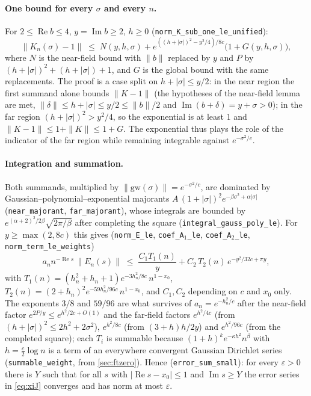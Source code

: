 \documentclass[11pt]{article}
\theoremstyle{definition}
\newcommand{\lean}[1]{\texttt{#1}}
\newcommand{\re}{\operatorname{Re}}
\newcommand{\im}{\operatorname{Im}}
\begin{document}
\paragraph{One bound for every $\sigma$ and every $n$.} For $2 \le \re b \le 4$, $y = \im b \ge 2$, $h \ge 0$ (\lean{norm\_K\_sub\_one\_le\_unified}):
\[
\|K_n(\sigma) - 1\| \;\le\; N(y,h,\sigma) + e^{((h+|\sigma|)^2 - y^2/4)/8c}\bigl(1 + G(y,h,\sigma)\bigr),
\]
where $N$ is the near-field bound with $\|b\|$ replaced by $y$ and $P$ by $(h+|\sigma|)^2 + (h+|\sigma|) + 1$, and $G$ is the global bound with the same replacements. The proof is a case split on $h + |\sigma| \le y/2$: in the near region the first summand alone bounds $\|K-1\|$ (the hypotheses of the near-field lemma are met, $\|\delta\| \le h + |\sigma| \le y/2 \le \|b\|/2$ and $\im(b+\delta) = y + \sigma > 0$); in the far region $(h+|\sigma|)^2 > y^2/4$, so the exponential is at least $1$ and $\|K - 1\| \le 1 + \|K\| \le 1 + G$. The exponential thus plays the role of the indicator of the far region while remaining integrable against $e^{-\sigma^2/c}$.

\paragraph{Integration and summation.} Both summands, multiplied by $\|\mathrm{gw}(\sigma)\| = e^{-\sigma^2/c}$, are dominated by Gaussian--polynomial--exponential majorants $A\,(1+|\sigma|)^2 e^{-\beta\sigma^2 + \alpha|\sigma|}$ (\lean{near\_majorant}, \lean{far\_majorant}), whose integrals are bounded by $e^{(\alpha+2)^2/2\beta}\sqrt{2\pi/\beta}$ after completing the square (\lean{integral\_gauss\_poly\_le}). For $y \ge \max(2, 8c)$ this gives (\lean{norm\_E\_le}, \lean{coef\_A$_1$\_le}, \lean{coef\_A$_2$\_le}, \lean{norm\_term\_le\_weights})
\[
a_n n^{-\re s}\,\|E_n(s)\| \;\le\; \frac{C_1 T_1(n)}{y} + C_2\,T_2(n)\,e^{-y^2/32c + \pi y},
\]
with $T_1(n) = (h_n^2 + h_n + 1)e^{-3h_n^2/8c}\,n^{1-x_0}$, $T_2(n) = (2+h_n)^2 e^{-59h_n^2/96c}\,n^{1-x_0}$, and $C_1, C_2$ depending on $c$ and $x_0$ only. The exponents $3/8$ and $59/96$ are what survives of $a_n = e^{-h_n^2/c}$ after the near-field factor $e^{2P/y} \le e^{h^2/2c + O(1)}$ and the far-field factors $e^{h^2/4c}$ (from $(h+|\sigma|)^2 \le 2h^2 + 2\sigma^2$), $e^{h^2/8c}$ (from $(3+h)h/2y$) and $e^{h^2/96c}$ (from the completed square); each $T_i$ is summable because $(1+h)^k e^{-\kappa h^2}n^{\beta}$ with $h = \tfrac{c}{2}\log n$ is a term of an everywhere convergent Gaussian Dirichlet series (\lean{summable\_weight}, from \cref{sec:ftzero}). Hence (\lean{error\_sum\_small}): for every $\varepsilon > 0$ there is $Y$ such that for all $s$ with $|\re s - x_0| \le 1$ and $\im s \ge Y$ the error series in \eqref{eq:xiJ} converges and has norm at most $\varepsilon$.
\end{document}
